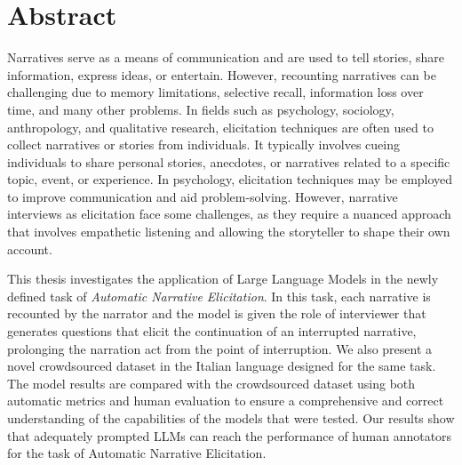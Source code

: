 \chapter*{Abstract} %
\label{abtract}


   Narratives serve as a means of communication and are used to tell stories, share information, express ideas, or entertain. However, recounting narratives can be challenging due to memory limitations, selective recall, information loss over time, and many other problems. In fields such as psychology, sociology, anthropology, and qualitative research, elicitation techniques are often used to collect narratives or stories from individuals. It typically involves cueing individuals to share personal stories, anecdotes, or narratives related to a specific topic, event, or experience. In psychology, elicitation techniques may be employed to improve communication and aid problem-solving. However, narrative interviews as elicitation face some challenges, as they require a nuanced approach that involves empathetic listening and allowing the storyteller to shape their own account.

This thesis investigates the application of Large Language Models in the newly defined task of \emph{Automatic Narrative Elicitation}. In this task, each narrative is recounted by the narrator and the model is given the role of interviewer that generates questions that elicit the continuation of an interrupted narrative, prolonging the narration act from the point of interruption.  We also present a novel crowdsourced dataset in the Italian language designed for the same task. The model results are compared with the crowdsourced dataset using both automatic metrics and human evaluation to ensure a comprehensive and correct understanding of the capabilities of the models that were tested. Our results show that adequately prompted LLMs can reach the performance of human annotators for the task of Automatic Narrative Elicitation.




